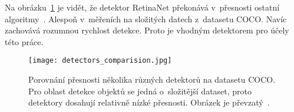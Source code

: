 Na obrázku~\ref{fig_detectors_comparision} je vidět, že detektor RetinaNet překonává v~přesnosti ostatní algoritmy~\cite{articleDetectorsComparision}. Alespoň v~měřeních na složitých datech z~datasetu COCO. Navíc zachovává rozumnou rychlost detekce. Proto je vhodným detektorem pro účely této práce.

\begin{figure}[H]
    \centering
    \texttt{[image: detectors\_comparision.jpg]}
    \caption[Porovnání přesnosti několika různých detektorů]{Porovnání přesnosti několika různých detektorů na datasetu COCO. Pro oblast detekce objektů se jedná o~složitější dataset, proto detektory dosahují relativně nízké přesnosti. Obrázek je převzatý~\cite{articleDetectorsComparision}.}
    \label{fig_detectors_comparision}
\end{figure}

